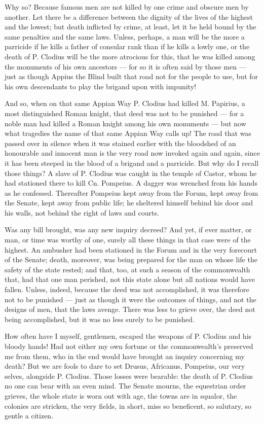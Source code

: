  Why so? Because famous men are not killed by one crime and obscure men by another. Let there be a difference between the dignity of the lives of the highest and the lowest; but death inflicted by crime, at least, let it be held bound by the same penalties and the same laws. Unless, perhaps, a man will be the more a parricide if he kills a father of consular rank than if he kills a lowly one, or the death of P. Clodius will be the more atrocious for this, that he was killed among the monuments of his own ancestors --- for so it is often said by those men --- just as though Appius the Blind built that road not for the people to use, but for his own descendants to play the brigand upon with impunity!

 And so, when on that same Appian Way P. Clodius had killed M. Papirius, a most distinguished Roman knight, that deed was not to be punished --- for a noble man had killed a Roman knight among his own monuments --- but now what tragedies the name of that same Appian Way calls up! The road that was passed over in silence when it was stained earlier with the bloodshed of an honourable and innocent man is the very road now invoked again and again, since it has been steeped in the blood of a brigand and a parricide. But why do I recall those things? A slave of P. Clodius was caught in the temple of Castor, whom he had stationed there to kill Cn. Pompeius. A dagger was wrenched from his hands as he confessed. Thereafter Pompeius kept away from the Forum, kept away from the Senate, kept away from public life; he sheltered himself behind his door and his walls, not behind the right of laws and courts.

 Was any bill brought, was any new inquiry decreed? And yet, if ever matter, or man, or time was worthy of one, surely all these things in that case were of the highest. An ambusher had been stationed in the Forum and in the very forecourt of the Senate; death, moreover, was being prepared for the man on whose life the safety of the state rested; and that, too, at such a season of the commonwealth that, had that one man perished, not this state alone but all nations would have fallen. Unless, indeed, because the deed was not accomplished, it was therefore not to be punished --- just as though it were the outcomes of things, and not the designs of men, that the laws avenge. There was less to grieve over, the deed not being accomplished, but it was no less surely to be punished.

 How often have I myself, gentlemen, escaped the weapons of P. Clodius and his bloody hands! Had not either my own fortune or the commonwealth's preserved me from them, who in the end would have brought an inquiry concerning my death? But we are fools to dare to set Drusus, Africanus, Pompeius, our very selves, alongside P. Clodius. Those losses were bearable: the death of P. Clodius no one can bear with an even mind. The Senate mourns, the equestrian order grieves, the whole state is worn out with age, the towns are in squalor, the colonies are stricken, the very fields, in short, miss so beneficent, so salutary, so gentle a citizen.


